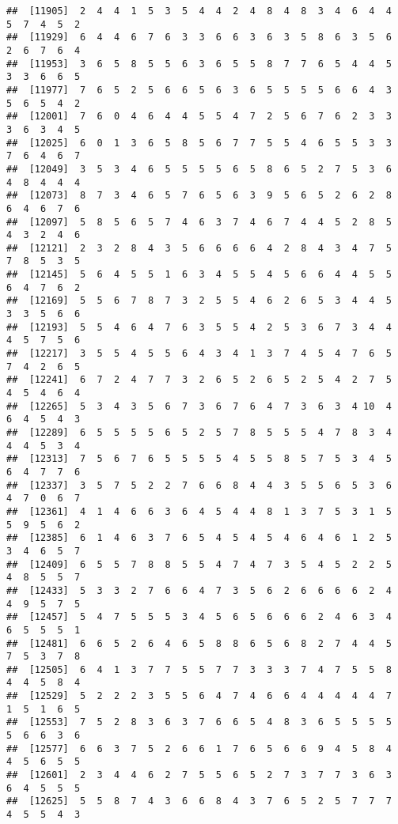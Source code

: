 \documentclass[
]{book}
\begin{document}
\begin{verbatim}
##  [11905]  2  4  4  1  5  3  5  4  4  2  4  8  4  8  3  4  6  4  4  5  7  4  5  2
##  [11929]  6  4  4  6  7  6  3  3  6  6  3  6  3  5  8  6  3  5  6  2  6  7  6  4
##  [11953]  3  6  5  8  5  5  6  3  6  5  5  8  7  7  6  5  4  4  5  3  3  6  6  5
##  [11977]  7  6  5  2  5  6  6  5  6  3  6  5  5  5  5  6  6  4  3  5  6  5  4  2
##  [12001]  7  6  0  4  6  4  4  5  5  4  7  2  5  6  7  6  2  3  3  3  6  3  4  5
##  [12025]  6  0  1  3  6  5  8  5  6  7  7  5  5  4  6  5  5  3  3  7  6  4  6  7
##  [12049]  3  5  3  4  6  5  5  5  5  6  5  8  6  5  2  7  5  3  6  4  8  4  4  4
##  [12073]  8  7  3  4  6  5  7  6  5  6  3  9  5  6  5  2  6  2  8  6  4  6  7  6
##  [12097]  5  8  5  6  5  7  4  6  3  7  4  6  7  4  4  5  2  8  5  4  3  2  4  6
##  [12121]  2  3  2  8  4  3  5  6  6  6  6  4  2  8  4  3  4  7  5  7  8  5  3  5
##  [12145]  5  6  4  5  5  1  6  3  4  5  5  4  5  6  6  4  4  5  5  6  4  7  6  2
##  [12169]  5  5  6  7  8  7  3  2  5  5  4  6  2  6  5  3  4  4  5  3  3  5  6  6
##  [12193]  5  5  4  6  4  7  6  3  5  5  4  2  5  3  6  7  3  4  4  4  5  7  5  6
##  [12217]  3  5  5  4  5  5  6  4  3  4  1  3  7  4  5  4  7  6  5  7  4  2  6  5
##  [12241]  6  7  2  4  7  7  3  2  6  5  2  6  5  2  5  4  2  7  5  4  5  4  6  4
##  [12265]  5  3  4  3  5  6  7  3  6  7  6  4  7  3  6  3  4 10  4  6  4  5  4  3
##  [12289]  6  5  5  5  5  6  5  2  5  7  8  5  5  5  4  7  8  3  4  4  4  5  3  4
##  [12313]  7  5  6  7  6  5  5  5  5  4  5  5  8  5  7  5  3  4  5  6  4  7  7  6
##  [12337]  3  5  7  5  2  2  7  6  6  8  4  4  3  5  5  6  5  3  6  4  7  0  6  7
##  [12361]  4  1  4  6  6  3  6  4  5  4  4  8  1  3  7  5  3  1  5  5  9  5  6  2
##  [12385]  6  1  4  6  3  7  6  5  4  5  4  5  4  6  4  6  1  2  5  3  4  6  5  7
##  [12409]  6  5  5  7  8  8  5  5  4  7  4  7  3  5  4  5  2  2  5  4  8  5  5  7
##  [12433]  5  3  3  2  7  6  6  4  7  3  5  6  2  6  6  6  6  2  4  4  9  5  7  5
##  [12457]  5  4  7  5  5  5  3  4  5  6  5  6  6  6  2  4  6  3  4  6  5  5  5  1
##  [12481]  6  6  5  2  6  4  6  5  8  8  6  5  6  8  2  7  4  4  5  7  5  3  7  8
##  [12505]  6  4  1  3  7  7  5  5  7  7  3  3  3  7  4  7  5  5  8  4  4  5  8  4
##  [12529]  5  2  2  2  3  5  5  6  4  7  4  6  6  4  4  4  4  4  7  1  5  1  6  5
##  [12553]  7  5  2  8  3  6  3  7  6  6  5  4  8  3  6  5  5  5  5  5  6  6  3  6
##  [12577]  6  6  3  7  5  2  6  6  1  7  6  5  6  6  9  4  5  8  4  4  5  6  5  5
##  [12601]  2  3  4  4  6  2  7  5  5  6  5  2  7  3  7  7  3  6  3  6  4  5  5  5
##  [12625]  5  5  8  7  4  3  6  6  8  4  3  7  6  5  2  5  7  7  7  4  5  5  4  3

\end{verbatim}
\end{document}
